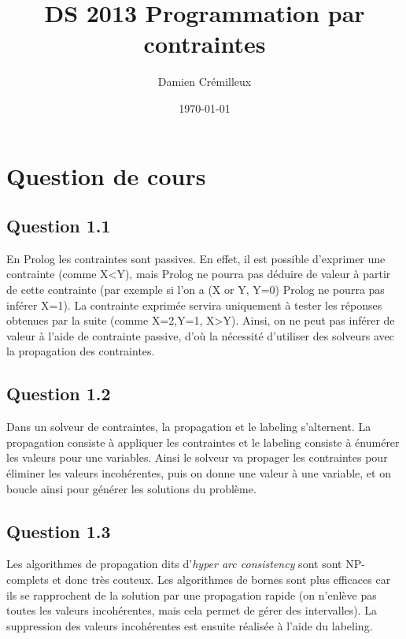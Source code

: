 \documentclass[a4paper]{article}
\begin{document}
\title{DS 2013 Programmation par contraintes}
\author{Damien Crémilleux}
\date{\today}

\maketitle


\section{Question de cours}

\subsection{Question 1.1}
En Prolog les contraintes sont passives. En effet, il est possible d'exprimer une contrainte (comme X<Y), mais Prolog ne pourra pas déduire de valeur à partir de cette contrainte (par exemple si l'on a (X or Y, Y=0) Prolog ne pourra pas inférer X=1). La contrainte exprimée servira uniquement à tester les réponses obtenues par la suite (comme X=2,Y=1, X>Y). Ainsi, on ne peut pas inférer de valeur à l'aide de contrainte passive, d'où la nécessité d'utiliser des solveurs avec la propagation des contraintes.

\subsection{Question 1.2}
Dans un solveur de contraintes, la propagation et le labeling s'alternent. La propagation consiste à appliquer les contraintes et le labeling consiste à énumérer les valeurs pour une variables. Ainsi le solveur va propager les contraintes pour éliminer les valeurs incohérentes, puis on donne une valeur à une variable, et on boucle ainsi pour générer les solutions du problème.

\subsection{Question 1.3}
Les algorithmes de propagation dits d'\textit{hyper arc consistency} sont sont NP-complets et donc très couteux. Les algorithmes de bornes sont plus efficaces car ils se rapprochent de la solution par une propagation rapide (on n'enlève pas toutes les valeurs incohérentes, mais cela permet de gérer des intervalles). La suppression des valeurs incohérentes est ensuite réalisée à l'aide du labeling.
\end{document}

